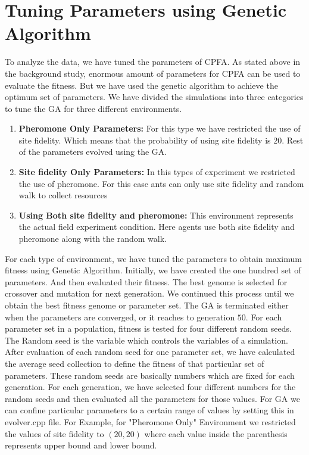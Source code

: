 \section{\label{section:Tuning Parameters using Genetic Algorithm}Tuning Parameters using Genetic Algorithm}
   To analyze the data, we have tuned the parameters of CPFA. As stated above in the background study, enormous amount of parameters for CPFA can be used to evaluate the fitness. But we have used the genetic algorithm to achieve the optimum set of parameters. We have divided the simulations into three categories to tune the GA for three different environments. 
   \begin{enumerate}
   	\item \textbf{Pheromone Only Parameters:}  For this type we have restricted the use of site fidelity. Which means that the probability of using site fidelity is $20$. Rest of the parameters evolved using the GA. 
   	\item \textbf{Site fidelity Only Parameters:} In this types of experiment we restricted the use of pheromone. For this case ants can only use site fidelity and random walk to collect resources
   	\item \textbf{Using Both site fidelity and pheromone:} This environment represents the actual field experiment condition. Here agents use both site fidelity and pheromone along with the random walk.    	
   \end{enumerate}
For each type of environment, we have tuned the parameters to obtain maximum fitness using Genetic Algorithm. Initially, we have created the one hundred set of parameters. And then evaluated their fitness. The best genome is selected for crossover and mutation for next generation. We continued this process until we obtain the best fitness genome or parameter set. The GA is terminated either when the parameters are converged, or it reaches to generation $50$.  
For each parameter set in a population, fitness is tested for four different random seeds. The Random seed is the variable which controls the variables of a simulation. After evaluation of each random seed for one parameter set, we have calculated the average seed collection to define the fitness of that particular set of parameters. These random seeds are basically numbers which are fixed for each generation. For each generation, we have selected four different numbers for the random seeds and then evaluated all the parameters for those values.
For GA we can confine particular parameters to a certain range of values by setting this in evolver.cpp file. For Example, for "Pheromone Only" Environment we restricted the values of site fidelity to $(20,20)$ where each value inside the parenthesis represents upper bound and lower bound.
